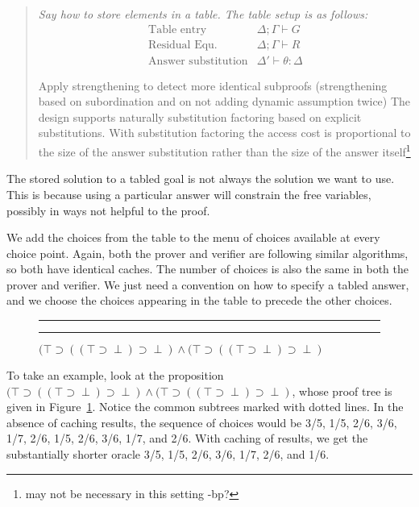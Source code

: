 \documentclass{acmconf}
\newcommand{\figfoot}{\vspace{1ex}\hrule}
\newcommand{\fighead}{\hrule\vspace{1.5ex}}
\newcommand{\andl}{\wedge}
\newcommand{\impl}{\supset}
\newcommand{\vd}{\vdash}
\newenvironment{note}{\begin{quote}\message{note!}\it}{\end{quote}}
\begin{document}
\begin{note}
  Say how to store elements in a table.
The table setup is as follows:
\[
\begin{array}{ll}
\mbox{Table entry} & \Delta ; \Gamma \vd G\\
\mbox{Residual Equ.} & \Delta ; \Gamma \vd R \\
\mbox{Answer substitution} & \Delta' \vd \theta : \Delta
\end{array}
\]

Apply strengthening to detect more identical subproofs (strengthening
based on subordination and on not adding dynamic assumption twice)
The design supports naturally substitution factoring based on explicit
substitutions\cite{RamakrishnanJLP99}. With substitution factoring the
access cost is proportional to the size of the answer substitution
rather than the size of the answer itself\footnote{may not be necessary in
this setting -bp?}
\end{note}

The stored solution to a tabled goal is not always the solution we
want to use.  This is because using a particular answer will constrain
the free variables, possibly in ways not helpful to the proof. 

We add the choices from the table to the menu of choices available at
every choice point. Again, both the prover and verifier are following
similar algorithms, so both have identical caches. The number of
choices is also the same in both the prover and verifier. We just need
a convention on how to specify a tabled answer, and we choose the
choices appearing in the table to precede the other choices.

\begin{figure}
\fighead
\hspace{-0.5in}
\vspace{1.5in}
\caption{\label{prooftree3}
$(\top\impl((\top\impl\perp)\impl\perp) \andl
(\top\impl((\top\impl\perp)\impl\perp)$}
\figfoot
\end{figure}

To take an example, look at the proposition
$(\top\impl((\top\impl\perp)\impl\perp) \andl
(\top\impl((\top\impl\perp)\impl\perp)$, whose proof tree is
given in Figure~\ref{prooftree3}. Notice the common subtrees marked
with dotted lines.  In the absence of caching results, the sequence of
choices would be 3/5, 1/5, 2/6, 3/6, 1/7, 2/6, 1/5, 2/6, 3/6, 1/7, and
2/6. With caching of results, we get the substantially shorter oracle
3/5, 1/5, 2/6, 3/6, 1/7, 2/6, and 1/6.
\end{document}
